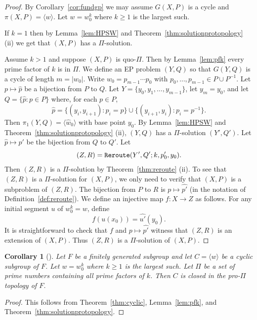 \documentclass[10pt,a4paper]{amsart}
\newtheorem{corollary}[theorem]{Corollary}
\theoremstyle{definition}
\theoremstyle{definition}
\numberwithin{equation}{section}
\begin{document}
\begin{proof} By Corollary~\ref{cor:fundgp} we may assume $G(X, P)$ is a cycle and $\pi(X, P)=\langle w\rangle$. Let $w=w_0^k$ where $k\geq 1$ is the largest such. 

If $k=1$ then by Lemma~\ref{lem:HPSW} and Theorem~\ref{thm:solutionprotopology} (ii) we get that $(X,P)$ has a $\Pi$-solution.

Assume $k>1$ and suppose $(X, P)$ is quo-$\Pi$. Then by Lemma~\ref{lem:pfk} every prime factor of $k$ is in $\Pi$. We define an EP problem $(Y, Q)$ so that $G(Y, Q)$ is a cycle of length $m=|w_0|$. Write $w_0=p_{m-1}\cdots p_0$ with $p_0,\dots, p_{m-1}\in P\cup P^{-1}$. Let $p\mapsto \hat{p}$ be a bijection from $P$ to $Q$. Let $Y=\{y_0, y_1, \dots, y_{m-1}\}$, let $y_m=y_0$, and let $Q=\{\hat{p}\colon p\in P\}$ where, for each $p\in P$, 
$$ \hat{p}=\{(y_i, y_{i+1})\colon p_i=p\}\cup \{(y_{i+1}, y_i)\colon p_i=p^{-1}\}. $$
Then $\pi_1(Y, Q)=\langle \hat{w}_0\rangle$ with base point $y_0$. By Lemma~\ref{lem:HPSW} and Theorem~\ref{thm:solutionprotopology} (ii), $(Y, Q)$ has a $\Pi$-solution $(Y', Q')$. Let $\hat{p}\mapsto p'$ be the bijection from $Q$ to $Q'$. Let 
$$ (Z, R)=\mbox{\tt Reroute}(Y', Q'; k, p'_0, y_0). $$
Then $(Z, R)$ is a $\Pi$-solution by Theorem~\ref{thm:reroute} (ii). To see that $(Z, R)$ is a $\Pi$-solution for $(X, P)$, we only need to verify that $(X, P)$ is a subproblem of $(Z, R)$. The bijection from $P$ to $R$ is $p\mapsto \widehat{p'}$ (in the notation of Definition~\ref{def:reroute}). We define an injective map $f\colon X\to Z$ as follows. For any initial segment $u$ of $w_0^k=w$, define
$$ f(u(x_0))=\widehat{u'}(y_0). $$
It is straightforward to check that $f$ and $p\mapsto \widehat{p'}$ witness that $(Z, R)$ is an extension of $(X, P)$. Thus $(Z, R)$ is a $\Pi$-solution of $(X, P)$.
\end{proof}

\begin{corollary}[{\cite[Theorem 1.5]{HPSW19}}] Let $F$ be a finitely generated subgroup and let $C=\langle w\rangle$ be a cyclic subgroup of $F$. Let $w=w_0^k$ where $k\geq 1$ is the largest such. Let $\Pi$ be a set of prime numbers containing all prime factors of $k$. Then $C$ is closed in the pro-$\Pi$ topology of $F$.
\end{corollary}

\begin{proof} This follows from Theorem~\ref{thm:cyclic}, Lemma~\ref{lem:pfk}, and Theorem~\ref{thm:solutionprotopology}.
\end{proof}
\end{document}
